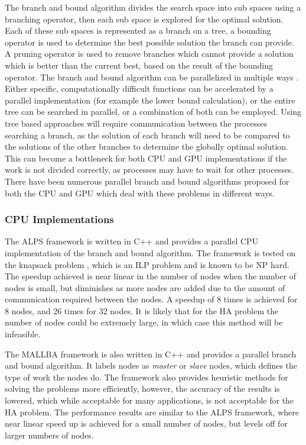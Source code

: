 \documentclass[10pt,twocolumn]{article}
\begin{document}
The branch and bound algorithm divides the search space into sub spaces using a branching operator, then each sub
space is explored for the optimal solution. Each of these sub spaces is represented as a branch on a tree, a bounding 
operator is used to determine the best possible solution the branch can provide. A pruning operator is used 
to remove branches which cannot provide a solution which is better than the current best, based on the result
of the bounding operator.
The branch and bound algorithm can be parallelized in multiple ways \cite{crainic:2006}. Either specific,
computationally difficult functions can be accelerated by a parallel implementation (for example the lower
bound calculation), or the entire tree can be searched in parallel, or a combination of both can be employed. Using tree
based approaches will require communication between the processes searching a branch, as the solution of each
branch will need to be compared to the solutions of the other branches to determine the globally optimal
solution. This can become a bottleneck for both CPU and GPU implementations if the work is not divided
correctly, as processes may have to wait for other processes. There have been numerous parallel branch and 
bound algorithms proposed for both the CPU and GPU which deal with these problems in different ways.

\subsubsection{CPU Implementations } \label{ssec:cpuimp}

The ALPS framework \cite{xu:2005} is written in C++ and provides a parallel CPU implementation of the branch
and bound algorithm. The framework is tested on the knapsack problem \cite{kedia:2005}, which is an ILP problem 
and is known to be NP hard. The speedup achieved is near linear in the number of nodes when the number of 
nodes is small, but diminishes as more nodes are added due to the amount of communication required between the nodes. 
A speedup of 8 times is achieved for 8 nodes, and 26 times for 32 nodes. It is likely that for the HA problem 
the number of nodes could be extremely large, in which case this method will be infeasible. 

The MALLBA framework \cite{alba:2002} is also written in C++ and provides a parallel branch and bound
algorithm. It labels nodes as \textit{master} or \textit{slave} nodes, which defines the type of work the
nodes do. The framework also provides heuristic methods for solving the problems more efficiently, however, the
accuracy of the results is lowered, which while acceptable for many applications, is not acceptable for the HA
problem. The performance results are similar to the ALPS framework, where near linear speed up is achieved for
a small number of nodes, but levels off for larger numbers of nodes.
\end{document}
